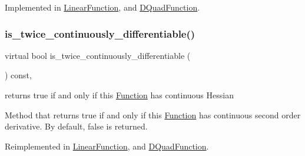 Implemented in \mbox{\hyperlink{class_s_m_spp__di__unipi__it_1_1_linear_function_a5950a5291f5ffab2cc9c42e33b7e6f27}{Linear\+Function}}, and \mbox{\hyperlink{class_s_m_spp__di__unipi__it_1_1_d_quad_function_aca502bb3d537cfa9aaee68cbbc03a410}{D\+Quad\+Function}}.

\mbox{\label{class_s_m_spp__di__unipi__it_1_1_c15_function_af95feab5ca3e555525ad19786347e2ec}} 
\subsubsection{\texorpdfstring{is\+\_\+twice\+\_\+continuously\+\_\+differentiable()}{is\_twice\_continuously\_differentiable()}}
{\footnotesize\ttfamily virtual bool is\+\_\+twice\+\_\+continuously\+\_\+differentiable (\begin{DoxyParamCaption}\item[{void}]{ }\end{DoxyParamCaption}) const\hspace{0.3cm}{\ttfamily [inline]}, {\ttfamily [virtual]}}



returns true if and only if this \mbox{\hyperlink{class_s_m_spp__di__unipi__it_1_1_function}{Function}} has continuous Hessian 

Method that returns true if and only if this \mbox{\hyperlink{class_s_m_spp__di__unipi__it_1_1_function}{Function}} has continuous second order derivative. By default, false is returned. 

Reimplemented in \mbox{\hyperlink{class_s_m_spp__di__unipi__it_1_1_linear_function_a272aecba91401ca432dfa79ad6091c3e}{Linear\+Function}}, and \mbox{\hyperlink{class_s_m_spp__di__unipi__it_1_1_d_quad_function_a272aecba91401ca432dfa79ad6091c3e}{D\+Quad\+Function}}.

\mbox{\label{class_s_m_spp__di__unipi__it_1_1_c15_function_a59a9fcbf8f9f86d348344b2073644b0e}} 
